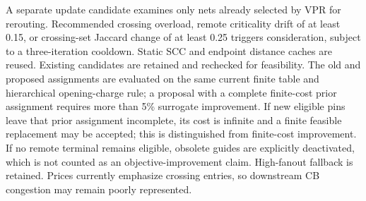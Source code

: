 \documentclass[conference,10pt]{IEEEtran}
\begin{document}
A separate update candidate examines only nets already selected by VPR for rerouting. Recommended crossing overload, remote criticality drift of at least 0.15, or crossing-set Jaccard change of at least 0.25 triggers consideration, subject to a three-iteration cooldown. Static SCC and endpoint distance caches are reused. Existing candidates are retained and rechecked for feasibility. The old and proposed assignments are evaluated on the same current finite table and hierarchical opening-charge rule; a proposal with a complete finite-cost prior assignment requires more than 5\% surrogate improvement. If new eligible pins leave that prior assignment incomplete, its cost is infinite and a finite feasible replacement may be accepted; this is distinguished from finite-cost improvement. If no remote terminal remains eligible, obsolete guides are explicitly deactivated, which is not counted as an objective-improvement claim. High-fanout fallback is retained. Prices currently emphasize crossing entries, so downstream CB congestion may remain poorly represented.
\end{document}
